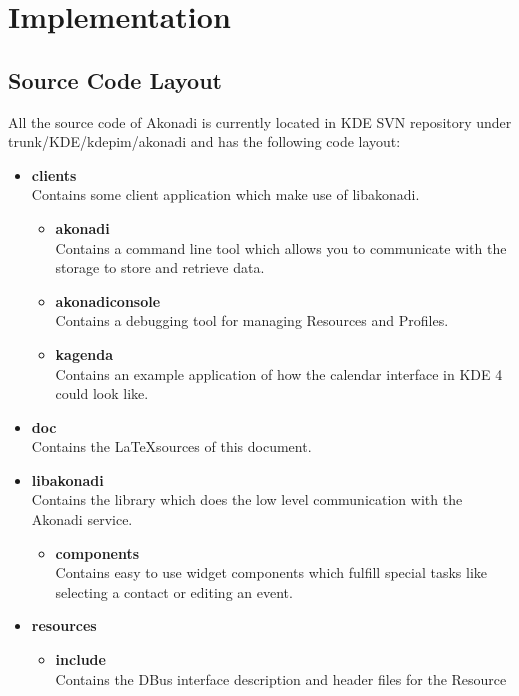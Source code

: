 \documentclass[]{report}
\begin{document}
\chapter{Implementation}

\section{Source Code Layout}
All the source code of Akonadi is currently located in KDE SVN repository under
trunk/KDE/kdepim/akonadi and has the following code layout:

\begin{itemize}
  \item \textbf{clients}\\
    Contains some client application which make use of libakonadi.
  \begin{itemize}
    \item \textbf{akonadi}\\
      Contains a command line tool which allows you to communicate with the
      storage to store and retrieve data.
    \item \textbf{akonadiconsole}\\
      Contains a debugging tool for managing Resources and Profiles.
    \item \textbf{kagenda}\\
      Contains an example application of how the calendar interface in KDE 4
      could look like.
  \end{itemize}
  \item \textbf{doc}\\
    Contains the \LaTeX sources of this document.
  \item \textbf{libakonadi}\\
    Contains the library which does the low level communication with the
    Akonadi service.
  \begin{itemize}
    \item \textbf{components}\\
      Contains easy to use widget components which fulfill special tasks like
      selecting a contact or editing an event.
  \end{itemize}
  \item \textbf{resources}\\
  \begin{itemize}
    \item \textbf{include}\\
      Contains the DBus interface description and header files for the Resource

\end{itemize}
\end{itemize}
\end{document}

